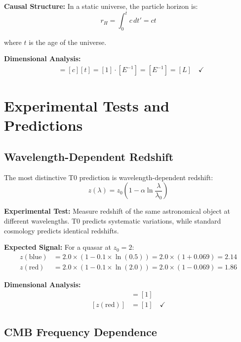 \documentclass[12pt,a4paper]{report}
\begin{document}
	\textbf{Causal Structure:}
	In a static universe, the particle horizon is:
	\begin{equation}
		r_H = \int_0^t c \, dt' = ct
	\end{equation}
	
	where $t$ is the age of the universe.
	
	\textbf{Dimensional Analysis:}
	\begin{align}
		[r_H] &= [c][t] = [1] \cdot [E^{-1}] = [E^{-1}] = [L] \quad \checkmark
	\end{align}
	
	\section{Experimental Tests and Predictions}
	\label{sec:experimental_tests}
	
	\subsection{Wavelength-Dependent Redshift}
	\label{subsec:wavelength_redshift_test}
	
	The most distinctive T0 prediction is wavelength-dependent redshift:
	\begin{equation}
		z(\lambda) = z_0\left(1 - \alpha \ln\frac{\lambda}{\lambda_0}\right)
	\end{equation}
	
	\textbf{Experimental Test:}
	Measure redshift of the same astronomical object at different wavelengths. T0 predicts systematic variations, while standard cosmology predicts identical redshifts.
	
	\textbf{Expected Signal:}
	For a quasar at $z_0 = 2$:
	\begin{align}
		z(\text{blue}) &= 2.0 \times (1 - 0.1 \times \ln(0.5)) = 2.0 \times (1 + 0.069) = 2.14 \\
		z(\text{red}) &= 2.0 \times (1 - 0.1 \times \ln(2.0)) = 2.0 \times (1 - 0.069) = 1.86
	\end{align}
	
	\textbf{Dimensional Analysis:}
	\begin{align}
		[z(\text{blue})] &= [1] \\
		[z(\text{red})] &= [1] \quad \checkmark
	\end{align}
	
	\subsection{CMB Frequency Dependence}
	\label{subsec:cmb_frequency_dependence}
	
\end{document}
